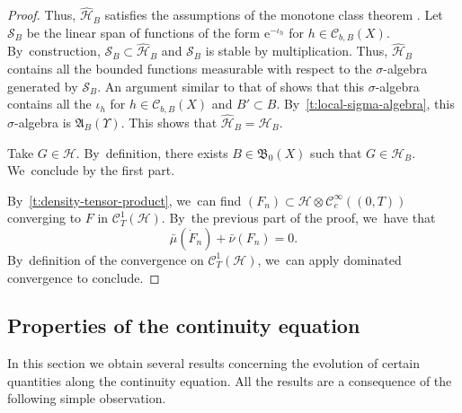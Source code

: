 \documentclass[JEP,XML,SOM,Unicode,published]{cedram}
\theoremstyle{definition}
\theoremstyle{remark}
\begin{document}
\begin{proof}
Thus, $\hat{\mathscr{H}}_{B}$ satisfies the assumptions of the monotone class theorem \cite[Th.\,21, p.\,20]{DellacherieMeyer}.
Let $\mathscr{S}_{B}$ be the linear span of functions of the form $\mathrm{e}^{-\iota_{h}}$ for $h \in \mathscr{C}_{b,B}(X)$.
By~construction, $\mathscr{S}_{B} \subset \hat{\mathscr{H}}_{B}$ and $\mathscr{S}_{B}$ is stable by multiplication.
Thus, $\hat{\mathscr{H}}_{B}$ contains all the bounded functions measurable with respect to the $\sigma$-algebra generated by $\mathscr{S}_{B}$.
An argument similar to that of \cite[Lem.\,2]{LastAnaSto} shows that this $\sigma$-algebra contains all the $\iota_{h}$ for $h \in \mathscr{C}_{b,B}(X)$ and $B' \subset B$.
By~\cref{t:local-sigma-algebra}, this $\sigma$-algebra is $\mathfrak{A}_{B}(\varUpsilon)$.
This shows that $\hat{\mathscr{H}}_{B} = \mathscr{H}_{B}$.

Take $G \in \mathscr{H}$.
By~definition, there exists $B \in \mathfrak{B}_{0}(X)$ such that $G \in \mathscr{H}_{B}$. We~conclude by the first part.

By~\cref{t:density-tensor-product}, we~can find $(F_{n}) \subset \mathscr{H} \otimes \mathscr{C}_{c}^{\infty}((0,T))$ converging to $F$ in $\mathscr{C}_{T}^{1}(\mathscr{H})$.
By~the previous part of the proof, we~have that
\begin{equation*}
\bar{\mu}(\dot{F}_{n}) + \bar{\nu}(F_{n}) = 0.
\end{equation*}
By~definition of the convergence on $\mathscr{C}_{T}^{1}(\mathscr{H})$, we~can apply dominated convergence to conclude.
\end{proof}

\subsection{Properties of the continuity equation}
In this section we obtain several results concerning the evolution of certain quantities along the continuity equation.
All the results are a consequence of the following simple observation.

\end{document}
